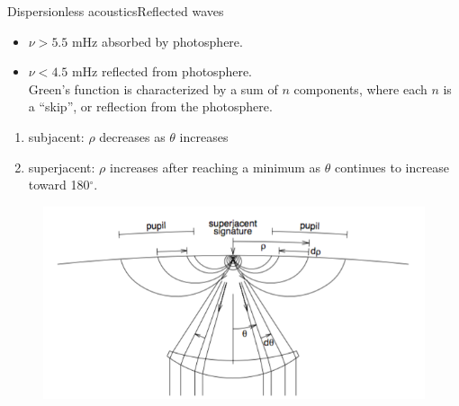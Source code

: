 \documentclass{beamer}
\begin{document}
\begin{frame}{Dispersionless acoustics}{Reflected waves}
    \begin{itemize}
        \item $\nu>5.5$ mHz absorbed by photosphere.
        \item $\nu<4.5$ mHz reflected from photosphere.\\
            Green's function is characterized by a sum of $n$ components, where
            each $n$ is a ``skip'', or reflection from the photosphere.
    \end{itemize}
    \begin{enumerate}
        \item subjacent: $\rho$ decreases as $\theta$ increases
        \item superjacent: $\rho$ increases after reaching a minimum
            as $\theta$ continues to increase toward 180$^{\circ}$.
    \end{enumerate}
\end{frame}

\begin{frame}
    \begin{figure}
        \includegraphics[width=\textwidth]{fig_4.png}
    \end{figure}
\end{frame}
\end{document}
